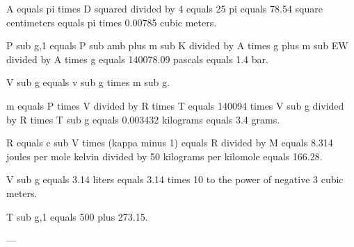 A equals pi times D squared divided by 4 equals 25 pi equals 78.54 square centimeters equals pi times 0.00785 cubic meters.  

P sub g,1 equals P sub amb plus m sub K divided by A times g plus m sub EW divided by A times g equals 140078.09 pascals equals 1.4 bar.  

V sub g equals v sub g times m sub g.  

m equals P times V divided by R times T equals 140094 times V sub g divided by R times T sub g equals 0.003432 kilograms equals 3.4 grams.  

R equals c sub V times (kappa minus 1) equals R divided by M equals 8.314 joules per mole kelvin divided by 50 kilograms per kilomole equals 166.28.  

V sub g equals 3.14 liters equals 3.14 times 10 to the power of negative 3 cubic meters.  

T sub g,1 equals 500 plus 273.15.  

---